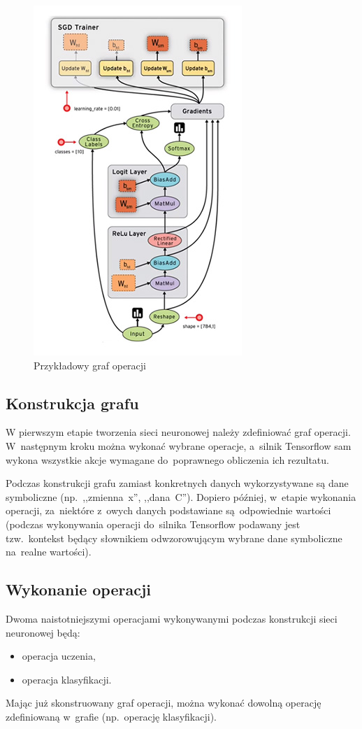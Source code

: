\begin{figure}[H]
	\centering
	\includegraphics[width=0.5\linewidth]{img/tf-sample-graph.jpg}
	\caption{Przykładowy graf operacji}
	\label{img:tf-smpl-grf}
\end{figure}

\subsection{Konstrukcja grafu}
W pierwszym etapie tworzenia sieci neuronowej należy zdefiniować graf operacji. W~następnym kroku można wykonać
wybrane operacje, a~silnik Tensorflow sam wykona wszystkie akcje wymagane do~poprawnego obliczenia ich rezultatu.

Podczas konstrukcji grafu zamiast konkretnych danych wykorzystywane są dane symboliczne (np.~,,zmienna~x'',
,,dana~C''). Dopiero później, w~etapie wykonania operacji, za~niektóre z~owych danych podstawiane
są~odpowiednie wartości (podczas wykonywania operacji do~silnika Tensorflow podawany jest tzw.~kontekst będący
słownikiem odwzorowującym wybrane dane symboliczne na~realne wartości).


\subsection{Wykonanie operacji}
Dwoma naistotniejszymi operacjami wykonywanymi podczas konstrukcji sieci neuronowej będą:
\begin{itemize}
    \item operacja uczenia,
    \item operacja klasyfikacji.
\end{itemize}

Mając już skonstruowany graf operacji, można wykonać dowolną operację zdefiniowaną w~grafie (np.~operację klasyfikacji).

